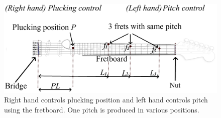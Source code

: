 \documentclass{article}
\begin{document}
\begin{figure}[h!]\
  \centering
  \centerline{\includegraphics[width=.9\columnwidth]{img/fender_drawing7.png}}\vspace{-2mm}
  \caption{Right hand controls plucking position and left hand controls pitch using the fretboard. One pitch is produced in various positions.
  }\label{fig:guitar_overview}\vspace{-2mm}
\end{figure}


%
%
%
%
\vspace{-1.9mm}
\end{document}
